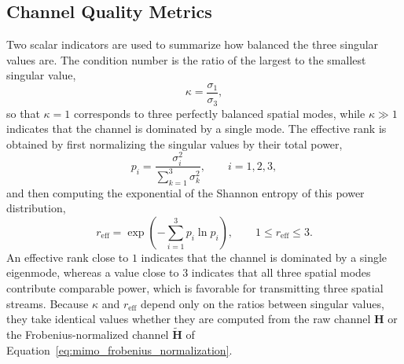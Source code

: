 \subsection{Channel Quality Metrics}
Two scalar indicators are used to summarize how balanced the three singular values are. The condition number is the ratio of the largest to the smallest singular value,
\begin{equation}
    \kappa = \frac{\sigma_1}{\sigma_3},
    \label{eq:mimo_condition_number}
\end{equation}
so that $\kappa=1$ corresponds to three perfectly balanced spatial modes, while $\kappa\gg1$ indicates that the channel is dominated by a single mode. The effective rank is obtained by first normalizing the singular values by their total power,
\begin{equation}
    p_i = \frac{\sigma_i^{2}}{\sum_{k=1}^{3}\sigma_k^{2}},
    \qquad i=1,2,3,
    \label{eq:mimo_power_fraction}
\end{equation}
and then computing the exponential of the Shannon entropy of this power distribution,
\begin{equation}
    r_{\mathrm{eff}} = \exp\!\left(-\sum_{i=1}^{3}p_i\ln p_i\right),
    \qquad 1\leq r_{\mathrm{eff}}\leq3.
    \label{eq:mimo_effective_rank}
\end{equation}
An effective rank close to $1$ indicates that the channel is dominated by a single eigenmode, whereas a value close to $3$ indicates that all three spatial modes contribute comparable power, which is favorable for transmitting three spatial streams. Because $\kappa$ and $r_{\mathrm{eff}}$ depend only on the ratios between singular values, they take identical values whether they are computed from the raw channel $\mathbf{H}$ or the Frobenius-normalized channel $\widetilde{\mathbf{H}}$ of Equation~\ref{eq:mimo_frobenius_normalization}.

